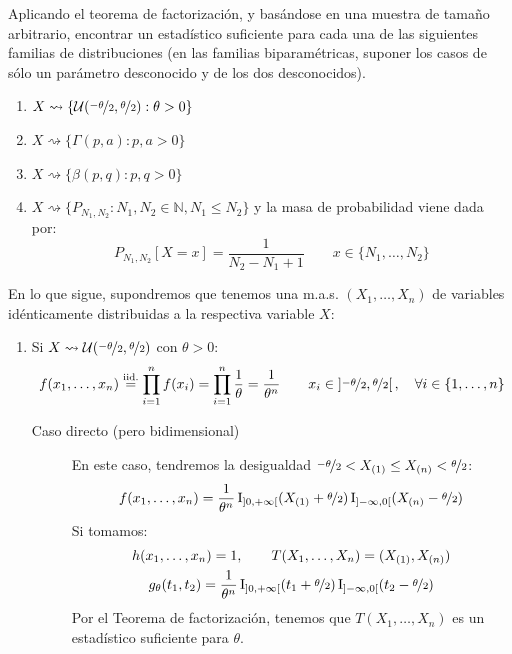 \begin{ejercicio}
    Aplicando el teorema de factorización, y basándose en una muestra de tamaño arbitrario, encontrar un estadístico suficiente para cada una de las siguientes familias de distribuciones (en las familias biparamétricas, suponer los casos de sólo un parámetro desconocido y de los dos desconocidos).
    \begin{enumerate}[label=\alph*)]
        \item $X\rightsquigarrow\{\mathcal{U}(\nicefrac{-\theta}{2},\nicefrac{\theta}{2}) : \theta>0\}$
        \item $X\rightsquigarrow\{\Gamma(p,a) : p,a > 0\}$
        \item $X\rightsquigarrow\{\beta(p,q) : p,q>0\}$
        \item $X\rightsquigarrow\{P_{N_1,N_2} : N_1, N_2 \in \mathbb{N}, N_1 \leq N_2\}$ y la masa de probabilidad viene dada por:
            \begin{equation*}
                P_{N_1, N_2}[X=x] = \dfrac{1}{N_2 - N_1 + 1} \qquad x\in \{N_1, \ldots, N_2\}
            \end{equation*}
    \end{enumerate}

    \noindent
    En lo que sigue, supondremos que tenemos una m.a.s. $(X_1, \ldots, X_n)$ de variables idénticamente distribuidas a la respectiva variable $X$:
    \begin{enumerate}[label=\alph*)]
        \item Si $X\rightsquigarrow \mathcal{U}(\nicefrac{-\theta}{2},\nicefrac{\theta}{2})$ con $\theta>0$:
            \begin{equation*}
                f(x_1, \ldots, x_n) \stackrel{\text{iid.}}{=}\prod_{i=1}^{n}f(x_i) = \prod_{i=1}^{n} \dfrac{1}{\theta} = \dfrac{1}{\theta^n} \qquad x_i \in \left]\nicefrac{-\theta}{2},\nicefrac{\theta}{2}\right[, \quad \forall i \in \{1,\ldots,n\}
            \end{equation*}

            \begin{description}
                \item[Caso directo (pero bidimensional)]
                En este caso, tendremos la desigualdad $\nicefrac{-\theta}{2}<X_{(1)}\leq X_{(n)} < \nicefrac{\theta}{2}$:
                \begin{equation*}
                    f(x_1, \ldots, x_n) = \dfrac{1}{\theta^n} \operatorname{I}_{\left]0,+\infty\right[}(X_{(1)}+\nicefrac{\theta}{2}) \operatorname{I}_{\left]-\infty,0\right[}(X_{(n)}-\nicefrac{\theta}{2})
                \end{equation*}
                Si tomamos:
                \begin{gather*}
                    h(x_1,\ldots,x_n)=1,\qquad T(X_1, \ldots, X_n) = (X_{(1)}, X_{(n)}) \\ g_{\theta}(t_1,t_2) = \dfrac{1}{\theta^n} \operatorname{I}_{\left]0,+\infty\right[}(t_1 + \nicefrac{\theta}{2}) \operatorname{I}_{\left]-\infty,0\right[}(t_2-\nicefrac{\theta}{2})
                \end{gather*}
                Por el Teorema de factorización, tenemos que $T(X_1, \ldots, X_n)$ es un estadístico suficiente para $\theta$.


\end{description}
\end{enumerate}
\end{ejercicio}
